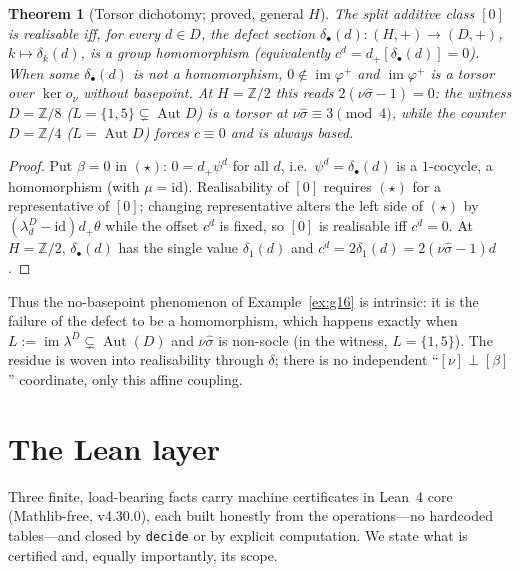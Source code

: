 \documentclass[11pt,reqno]{amsart}
\theoremstyle{plain}
\newtheorem{theorem}{Theorem}[section]
\theoremstyle{definition}
\newcommand{\Z}{\mathbb{Z}}
\newcommand{\id}{\mathrm{id}}
\newcommand{\im}{\operatorname{im}}
\newcommand{\Aut}{\operatorname{Aut}}
\newcommand{\shat}{\widehat{\sigma}}
\newcommand{\lD}{\lambda^{D}}
\begin{document}
\begin{theorem}[Torsor dichotomy; proved, general $H$]\label{thm:torsor}
The split additive class $[0]$ is realisable iff, for every $d\in D$, the defect section
$\delta_\bullet(d)\colon(H,+)\to(D,+)$, $k\mapsto\delta_k(d)$, is a group homomorphism
(equivalently $c^d=d_+[\delta_\bullet(d)]=0$). When some $\delta_\bullet(d)$ is not a
homomorphism, $0\notin\im\varphi^{+}$ and $\im\varphi^{+}$ is a torsor over $\ker o_\nu$
without basepoint. At $H=\Z/2$ this reads $2(\nu\shat-1)=0$: the witness $D=\Z/8$
($L=\{1,5\}\subsetneq\Aut D$) is a torsor at $\nu\shat\equiv3\pmod4$, while the counter
$D=\Z/4$ ($L=\Aut D$) forces $c\equiv0$ and is always based.
\end{theorem}
\begin{proof}
Put $\beta=0$ in $(\star)$: $0=d_+\psi^d$ for all $d$, i.e.\ $\psi^d=\delta_\bullet(d)$ is a
$1$-cocycle, a homomorphism (with $\mu=\id$). Realisability of $[0]$ requires $(\star)$ for a
representative of $[0]$; changing representative alters the left side of $(\star)$ by
$(\lD_d-\id)d_+\theta$ while the offset $c^d$ is fixed, so $[0]$ is realisable iff $c^d=0$.
At $H=\Z/2$, $\delta_\bullet(d)$ has the single value $\delta_1(d)$ and
$c^d=2\delta_1(d)=2(\nu\shat-1)d$.
\end{proof}

Thus the no-basepoint phenomenon of Example~\ref{ex:g16} is intrinsic: it is the failure of
the defect to be a homomorphism, which happens exactly when $L:=\im\lD\subsetneq\Aut(D)$
and $\nu\shat$ is non-socle (in the witness, $L=\{1,5\}$). The residue is woven into
realisability through $\delta$; there is no independent ``$[\nu]\perp[\beta]$'' coordinate,
only this affine coupling.

\section{The Lean layer}\label{sec:lean}

Three finite, load-bearing facts carry machine certificates in Lean~4 core (Mathlib-free,
v4.30.0), each built honestly from the operations---no hardcoded tables---and closed by
\texttt{decide} or by explicit computation. We state what is certified and, equally
importantly, its scope.
\end{document}
